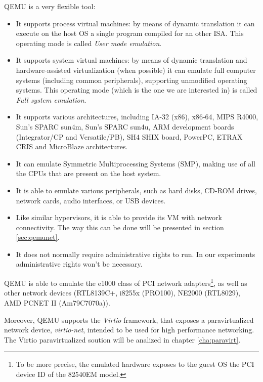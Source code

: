 QEMU is a very flexible tool:
\begin{itemize}
    \item It supports process virtual machines: by means of dynamic translation it can execute on the host OS a single program compiled 
	  for an other ISA. This operating mode is called \emph{User mode emulation}.
	  
    \item It supports system virtual machines: by means of dynamic translation and hardware-assisted virtualization (when possible) it
	  can emulate full computer systems (including common peripherals), supporting unmodified operating systems. This operating
	  mode (which is the one we are interested in) is called \emph{Full system emulation}.
	  
    \item It supports various architectures, including  IA-32 (x86), x86-64, MIPS R4000, Sun's SPARC sun4m, Sun's SPARC sun4u,
	  ARM development boards (Integrator/CP and Versatile/PB), SH4 SHIX board, PowerPC,
	  ETRAX CRIS and MicroBlaze architectures.
	  
    \item It can emulate Symmetric Multiprocessing Systems (SMP), making use of all the CPUs that are present on the 
	  host system.
	  
    \item It is able to emulate various peripherals, such as hard disks, CD-ROM drives, network cards, audio interfaces, 
	  or USB devices.
	  
    \item Like similar hypervisors, it is able to provide its VM with network connectivity. The way this can be done will be
	  presented in section \ref{sec:qemunet}.
	  
    \item It does not normally require administrative rights to run. In our experiments administrative rights won't be
	  necessary.
\end{itemize}

QEMU is able to emulate the e1000 class of PCI network adapters\footnote{To be more precise, the emulated hardware exposes
to the guest OS the PCI device ID of the 82540EM model.}, as well as other network devices (RTL8139C+, i8255x (PRO100), 
NE2000 (RTL8029), AMD PCNET II (Am79C7070a)).

Moreover, QEMU supports the \emph{Virtio} framework, that exposes a paravirtualized network device, \emph{virtio-net}, intended 
to be used for high performance networking. The Virtio paravirtualized soution will be analized in chapter \ref{cha:paravirt}.



